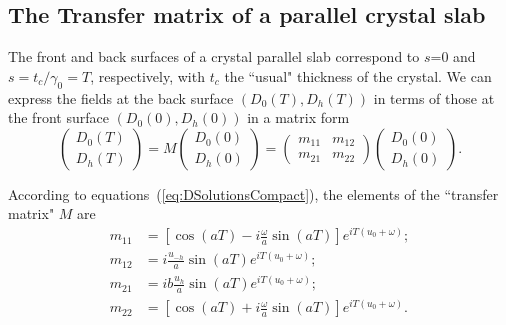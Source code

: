 \documentclass[preprint]{iucr}              %
\begin{document}



\subsection{The Transfer matrix of a parallel crystal slab}
\label{sec:transferMatrix}

The front and back surfaces of a crystal parallel slab correspond to $s$=0 and $s=t_c/\gamma_0=T$, respectively, with $t_c$ the ``usual" thickness of the crystal.
We can express the fields at the back surface $(D_0(T),D_h(T))$ in terms of those at the front surface $(D_0(0),D_h(0))$ in a matrix form
\begin{equation}\label{eq:Mtransfer}
    \begin{pmatrix}
    D_0(T)\\
    D_h(T)
    \end{pmatrix}
    =
    M
        \begin{pmatrix}
    D_0(0) \\
    D_h(0)
    \end{pmatrix}
    =
    \begin{pmatrix}
    m_{11} & m_{12}\\
    m_{21} & m_{22}
    \end{pmatrix}
    \begin{pmatrix}
    D_0(0) \\
    D_h(0)
    \end{pmatrix}.
\end{equation}

According to equations~(\ref{eq:DSolutionsCompact}), the elements of the ``transfer matrix" $M$ are
\begin{subequations}\label{eq:MtransferElements}
\begin{align}
m_{11} &= \left[ \cos(aT)-i\frac{\omega}{a}\sin(aT) \right] e^{i T (u_0+\omega)};\\
m_{12} &= i \frac{u_{-h}}{a}\sin(aT) e^{i T (u_0+\omega)};\\
m_{21} &= i b \frac{u_h }{a} \sin(aT) e^{i T (u_0+\omega)};\\
m_{22} &= \left[ \cos(aT)+i \frac{\omega}{a}\sin(aT) \right] e^{i T (u_0+\omega)}.
\end{align}
\end{subequations}
\end{document}

